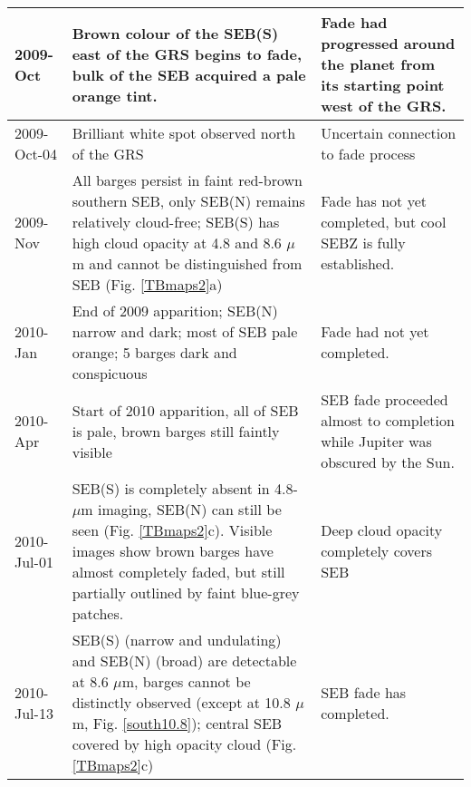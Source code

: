\documentclass[final,5p,times,twocolumn,authoryear]{elsarticle}
\begin{document}
\begin{table*}[htdp]
\begin{center}
\begin{tabular}{|l|p{10cm}|p{6cm}|}
2009-Oct & Brown colour of the SEB(S) east of the GRS begins to fade, bulk of the SEB acquired a pale orange tint. & Fade had progressed around the planet from its starting point west of the GRS. \\
\hline

2009-Oct-04 & Brilliant white spot observed north of the GRS \citep{10rogers} & Uncertain connection to fade process \\
\hline

2009-Nov & All barges persist in faint red-brown southern SEB, only SEB(N) remains relatively cloud-free; SEB(S) has high cloud opacity at 4.8 and 8.6 $\mu$m and cannot be distinguished from SEB (Fig. \ref{TBmaps2}a) & Fade has not yet completed, but cool SEBZ is fully established. \\
\hline

2010-Jan & End of 2009 apparition; SEB(N) narrow and dark; most of SEB pale orange; 5 barges dark and conspicuous & Fade had not yet completed. \\
\hline

2010-Apr & Start of 2010 apparition, all of SEB is pale, brown barges still faintly visible & SEB fade proceeded almost to completion while Jupiter was obscured by the Sun. \\
\hline

2010-Jul-01 & SEB(S) is completely absent in 4.8-$\mu$m imaging, SEB(N) can still be seen (Fig. \ref{TBmaps2}c).  Visible images show brown barges have almost completely faded, but still partially outlined by faint blue-grey patches. & Deep cloud opacity completely covers SEB \\
\hline

2010-Jul-13 & SEB(S) (narrow and undulating) and SEB(N) (broad) are detectable at 8.6 $\mu$m, barges cannot be distinctly observed (except at 10.8 $\mu$m, Fig. \ref{south10.8}); central SEB covered by high opacity cloud (Fig. \ref{TBmaps2}c) & SEB fade has completed.\\


\hline
\end{tabular}
\end{center}
\label{tab:timeline}
\end{table*}%
\end{document}

